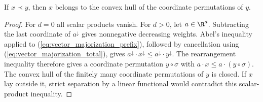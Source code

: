 \begin{lemma}
    \label{lem:vector_majorization_convex_hull}
    \leanok
    If $x\prec y$, then $x$ belongs to the convex hull of the
    coordinate permutations of $y$.
\end{lemma}
\begin{proof}\leanok
    For $d=0$ all scalar products vanish. For $d>0$, let $a\in\R^d$.
    Subtracting the last coordinate of $a^\downarrow$ gives nonnegative
    decreasing weights. Abel's inequality applied to
    (\ref{eq:vector_majorization_prefix}), followed by cancellation using
    (\ref{eq:vector_majorization_total}), gives
    $a^\downarrow\cdot x^\downarrow\leq
    a^\downarrow\cdot y^\downarrow$.
    The rearrangement inequality therefore gives a coordinate permutation
    $y\circ\sigma$ with $a\cdot x\leq a\cdot(y\circ\sigma)$.
    The convex hull of the finitely many coordinate permutations of $y$
    is closed. If $x$ lay outside it, strict separation by a linear
    functional would contradict this scalar-product inequality.
\end{proof}

